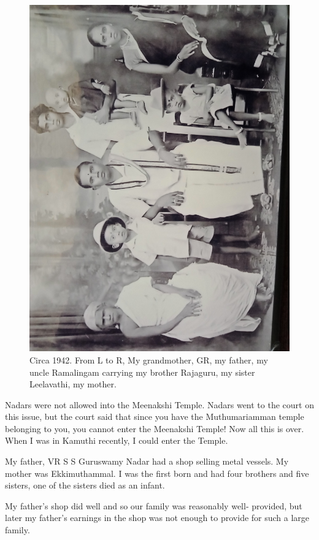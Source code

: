 \begin{figure}[H]
\centering 
\includegraphics[angle=270, width=1\textwidth]{images/Rajaji-01.jpg}
\caption{\small{Circa 1942. From L to R, My grandmother, GR, my father, 
my uncle Ramalingam carrying my brother Rajaguru, my sister
Leelavathi, my mother.}}
\end{figure}

Nadars were not allowed into the Meenakshi Temple. Nadars went to the 
court on this issue, but the court said that since you have the 
Muthumariamman temple belonging to you, you cannot enter the Meenakshi 
Temple! Now all this is over. When I was in Kamuthi recently, I could 
enter the Temple.

My father, VR S S Guruswamy Nadar had a shop selling metal vessels. My 
mother was Ekkimuthammal. I was the first born and had four brothers and 
five sisters, one of the sisters died as an infant.

My father's shop did well and so our family was reasonably well- 
provided, but later my father's earnings in the shop was not enough to 
provide for such a large family.

